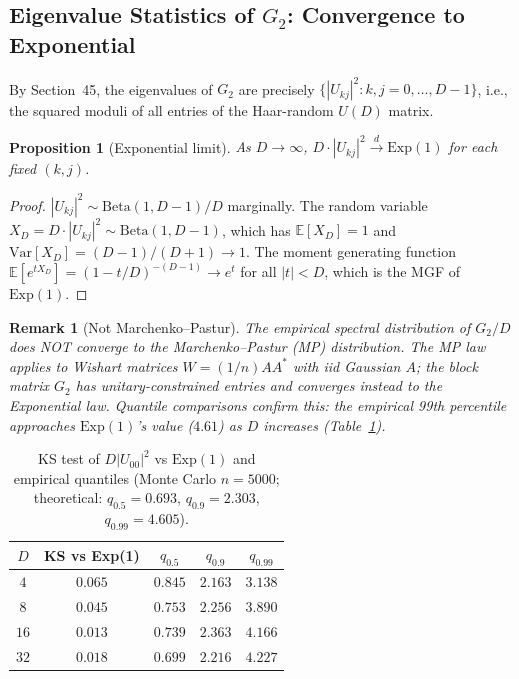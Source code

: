 \documentclass[12pt,a4paper]{article}
\newtheorem{proposition}[theorem]{Proposition}
\newtheorem{remark}[theorem]{Remark}
\begin{document}
\subsection{Eigenvalue Statistics of $G_2$: Convergence to Exponential}
\label{subsec:eig_statistics}

By Section~45, the eigenvalues of $G_2$ are precisely $\{|U_{kj}|^2 : k,j=0,\ldots,D-1\}$,
i.e., the squared moduli of all entries of the Haar-random $U(D)$ matrix.

\begin{proposition}[Exponential limit]\label{prop:exp_limit}
As $D\to\infty$, $D\cdot|U_{kj}|^2\xrightarrow{d}\mathrm{Exp}(1)$ for each fixed $(k,j)$.
\end{proposition}

\begin{proof}
$|U_{kj}|^2\sim\mathrm{Beta}(1,D-1)/D$ marginally.
The random variable $X_D=D\cdot|U_{kj}|^2\sim\mathrm{Beta}(1,D-1)$, which has
$\mathbb{E}[X_D]=1$ and $\mathrm{Var}[X_D]=(D-1)/(D+1)\to1$.
The moment generating function $\mathbb{E}[e^{tX_D}]=(1-t/D)^{-(D-1)}\to e^t$
for all $|t|<D$, which is the MGF of $\mathrm{Exp}(1)$.
\end{proof}

\begin{remark}[Not Marchenko–Pastur]
The empirical spectral distribution of $G_2/D$ does NOT converge to the
Marchenko–Pastur (MP) distribution.  The MP law applies to Wishart matrices
$W=(1/n)AA^*$ with iid Gaussian $A$; the block matrix $G_2$ has unitary-constrained
entries and converges instead to the Exponential law.  Quantile comparisons
confirm this: the empirical 99th percentile approaches $\mathrm{Exp}(1)$'s
value ($4.61$) as $D$ increases (Table~\ref{tab:eig_stats}).
\end{remark}

\begin{table}[h]
\centering
\caption{KS test of $D|U_{00}|^2$ vs $\mathrm{Exp}(1)$ and empirical quantiles
(Monte Carlo $n=5000$; theoretical: $q_{0.5}=0.693$, $q_{0.9}=2.303$, $q_{0.99}=4.605$).}
\label{tab:eig_stats}
\begin{tabular}{c|c|ccc}
\hline
$D$ & KS vs Exp(1) & $q_{0.5}$ & $q_{0.9}$ & $q_{0.99}$ \\
\hline
$4$  & $0.065$ & $0.845$ & $2.163$ & $3.138$ \\
$8$  & $0.045$ & $0.753$ & $2.256$ & $3.890$ \\
$16$ & $0.013$ & $0.739$ & $2.363$ & $4.166$ \\
$32$ & $0.018$ & $0.699$ & $2.216$ & $4.227$ \\
\hline
\end{tabular}
\end{table}
\end{document}
